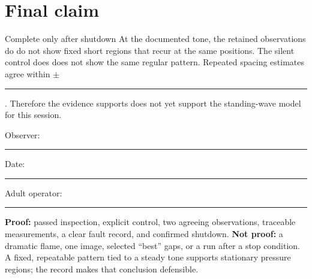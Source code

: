 \section{Final claim}
\begin{telospanel}{Complete only after shutdown}
At the documented tone, the retained observations
\fbox{\phantom{x}} do \quad \fbox{\phantom{x}} do not
show fixed short regions that recur at the same positions. The silent control
\fbox{\phantom{x}} does \quad \fbox{\phantom{x}} does not
show the same regular pattern. Repeated spacing estimates agree within
\(\pm\)\rule{12mm}{.4pt}. Therefore the evidence
\fbox{\phantom{x}} supports \quad \fbox{\phantom{x}} does not yet support
the standing-wave model for this session.

\vspace{3mm}
Observer:\ \rule{38mm}{.4pt}\quad Date:\ \rule{25mm}{.4pt}\quad
Adult operator:\ \rule{38mm}{.4pt}
\end{telospanel}

\begin{telosframe}
\footnotesize
\textbf{Proof:} passed inspection, explicit control, two agreeing observations,
traceable measurements, a clear fault record, and confirmed shutdown.
\textbf{Not proof:} a dramatic flame, one image, selected ``best'' gaps, or a
run after a stop condition. A fixed, repeatable pattern tied to a steady tone
supports stationary pressure regions; the record makes that conclusion
defensible.
\end{telosframe}

